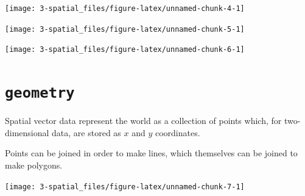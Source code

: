 \documentclass[
]{report}
\begin{document}
\begin{center}\texttt{[image: 3-spatial\_files/figure-latex/unnamed-chunk-4-1]} \end{center}

\begin{center}\texttt{[image: 3-spatial\_files/figure-latex/unnamed-chunk-5-1]} \end{center}

\begin{center}\texttt{[image: 3-spatial\_files/figure-latex/unnamed-chunk-6-1]} \end{center}

\hypertarget{geometry}{%
\section{\texorpdfstring{\texttt{geometry}}{geometry}}\label{geometry}}

Spatial vector data represent the world as a collection of points which, for two-dimensional data, are stored as \(x\) and \(y\) coordinates.

Points can be joined in order to make lines, which themselves can be joined to make polygons.

\begin{center}\texttt{[image: 3-spatial\_files/figure-latex/unnamed-chunk-7-1]} \end{center}
\end{document}

